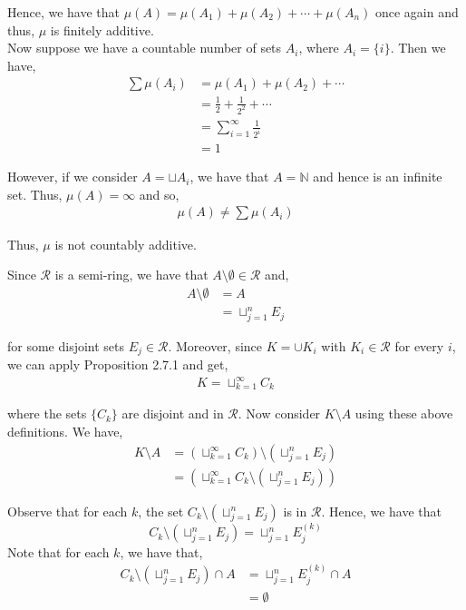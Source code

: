 \documentclass[12pt]{article}
\newenvironment{problem}[2][Problem]{\begin{trivlist}
\item[\hskip \labelsep {\bfseries #1}\hskip \labelsep {\bfseries #2.}]}{\end{trivlist}}
\begin{document}
Hence, we have that $\mu(A) = \mu(A_1) + \mu(A_2) + \cdots + \mu(A_n)$ once again and thus, $\mu$ is finitely additive.\\

Now suppose we have a countable number of sets $A_i$, where $A_i = \{i\}$. Then we have,
\begin{align*}
\sum \mu(A_i) &= \mu(A_1) + \mu(A_2) + \cdots\\
&= \frac{1}{2} + \frac{1}{2^2} + \cdots\\
&= \sum_{i=1}^{\infty} \frac{1}{2^i}\\
&= 1
\end{align*}

However, if we consider $A = \sqcup A_i$, we have that $A = \mathbb{N}$ and hence is an infinite set. Thus, $\mu(A) = \infty$ and so,
\begin{align*}
\mu(A) \neq  \sum \mu(A_i)
\end{align*}

Thus, $\mu$ is not countably additive.

\begin{problem}{2}
\end{problem}

Since $\mathcal{R}$ is a semi-ring, we have that $A \setminus \emptyset \in \mathcal{R}$ and,
\begin{align*}
A \setminus \emptyset &= A\\
&= \sqcup_{j=1}^n E_j
\end{align*}

for some disjoint sets $E_j \in \mathcal{R}$. Moreover, since $K = \cup K_i$ with $K_i \in \mathcal{R}$ for every $i$, we can apply Proposition 2.7.1 and get,
\begin{align*}
K = \sqcup_{k=1}^{\infty} C_k
\end{align*}

where the sets $\{C_k\}$ are disjoint and in $\mathcal{R}$. Now consider $K \setminus A$ using these above definitions. We have,
\begin{align*}
K \setminus A &= \left(\sqcup_{k=1}^{\infty} C_k \right) \setminus \left(\sqcup_{j=1}^n E_j\right)\\
&= \left(\sqcup_{k=1}^{\infty} C_k \setminus \left(\sqcup_{j=1}^n E_j\right)\right)
\end{align*}

Observe that for each $k$, the set $C_k \setminus \left(\sqcup_{j=1}^n E_j\right)$ is in $\mathcal{R}$. Hence, we have that $$C_k \setminus \left(\sqcup_{j=1}^n E_j\right) = \sqcup_{j=1}^n E_j^{(k)}$$ Note that for each $k$, we have that,
\begin{align*}
C_k \setminus \left(\sqcup_{j=1}^n E_j\right) \cap A &= \sqcup_{j=1}^n E_j^{(k)} \cap A\\
&= \emptyset
\end{align*}
\end{document}
